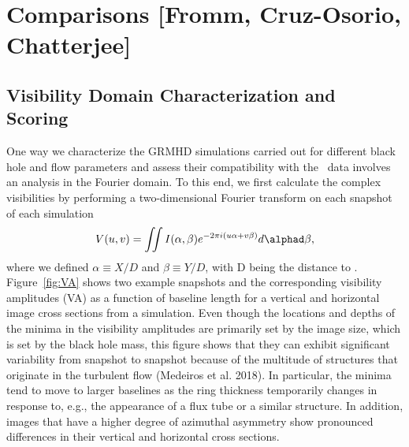 \documentclass[twocolumn,tighten,dvipsnames,linenumbers]{aastex63}
\begin{document}



\section{Comparisons
  [Fromm, Cruz-Osorio, Chatterjee]}
\label{sec:comparisons}

\subsection{Visibility Domain Characterization and Scoring}

One way we characterize the GRMHD simulations carried out for different
black hole and flow parameters and assess their compatibility
with the \sgra\ data involves an analysis in the Fourier domain. To this
end, we first calculate the complex visibilities by performing a
two-dimensional Fourier transform on each snapshot of each simulation
\begin{equation}
V(u,v) = \iint I(\alpha,\beta) e^{-2\pi i(u\alpha+v\beta)}d\alphad\beta,
\end{equation}
where we defined $\alpha \equiv X/D$ and $\beta \equiv Y/D$, with D
being the distance to \sgra. Figure~\ref{fig:VA} shows two example
snapshots and the corresponding visibility amplitudes (VA) as a
function of baseline length for a vertical and horizontal image cross
sections from a simulation. Even though the locations and depths of
the minima in the visibility amplitudes are primarily set by the image
size, which is set by the black hole mass, this figure shows that they
can exhibit significant variability from snapshot to snapshot because
of the multitude of structures that originate in the turbulent flow
(Medeiros et al. 2018). In particular, the minima tend to move to
larger baselines as the ring thickness temporarily changes in response
to, e.g., the appearance of a flux tube or a similar structure. In
addition, images that have a higher degree of azimuthal asymmetry show
pronounced differences in their vertical and horizontal cross
sections.
\end{document}

